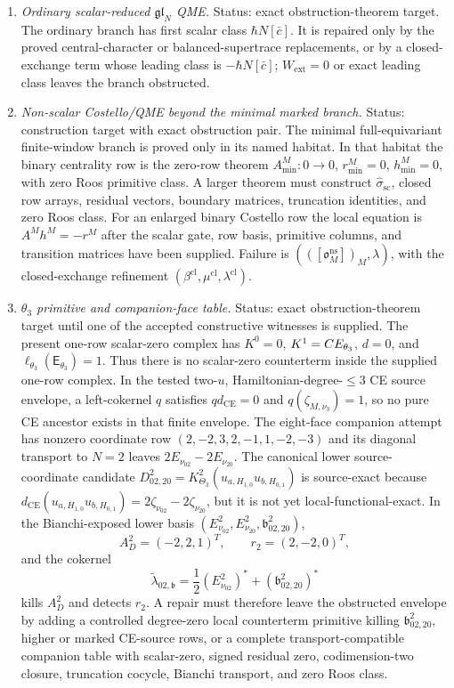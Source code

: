 \begin{enumerate}
  \item \emph{Ordinary scalar-reduced \(\mathfrak{gl}_N\) QME.}
  Status: exact obstruction-theorem target.  The ordinary branch has first
  scalar class \(\hbar N[\bar c]\).  It is repaired only by the proved
  central-character or balanced-supertrace replacements, or by a
  closed-exchange term whose leading class is \(-\hbar N[\bar c]\);
  \(W_{\mathrm{ext}}=0\) or exact leading class leaves the branch
  obstructed.

  \item \emph{Non-scalar Costello/QME beyond the minimal marked branch.}
  Status: construction target with exact obstruction pair.  The minimal
  full-equivariant finite-window branch is proved only in its named
  habitat.  In that habitat the binary centrality row is the zero-row
  theorem
  \(A^M_{\min}:0\to0\), \(r^M_{\min}=0\), \(h^M_{\min}=0\), with zero
  Roos primitive class.  A larger theorem must construct
  \(\widehat\sigma_{\mathrm{sc}}\),
  closed row arrays, residual vectors, boundary matrices, truncation
  identities, and zero Roos class.  For an enlarged binary Costello row
  the local equation is \(A^Mh^M=-r^M\) after the scalar gate, row basis,
  primitive columns, and transition matrices have been supplied.  Failure is
  \((([\mathfrak o^{\mathrm{ns}}_M])_M,\lambda)\), with the
  closed-exchange refinement
  \((\beta^{\mathrm{cl}},\mu^{\mathrm{cl}},\lambda^{\mathrm{cl}})\).

  \item \emph{\(\theta_3\) primitive and companion-face table.}
  Status: exact obstruction-theorem target until one of the accepted
  constructive witnesses is supplied.  The present one-row scalar-zero
  complex has \(K^0=0\), \(K^1=CE_{\theta_3}\), \(d=0\), and
  \(\ell_{\theta_3}(\mathsf E_{\theta_3})=1\).  Thus there is no
  scalar-zero counterterm inside the supplied one-row complex.  In the
  tested two-\(u\), Hamiltonian-degree-\(\le3\) CE source envelope, a
  left-cokernel \(q\) satisfies \(qd_{\mathrm{CE}}=0\) and
  \(q(\zeta_{M,\nu_3})=1\), so no pure CE ancestor exists in that finite
  envelope.  The eight-face companion attempt has nonzero coordinate row
  \((2,-2,3,2,-1,1,-2,-3)\) and its diagonal transport to \(N=2\)
  leaves \(2E_{\nu_{02}}-2E_{\nu_{20}}\).  The canonical lower
  source-coordinate candidate
  \(D^2_{02,20}=K^2_{\Theta_3}
  (u_{a,H_{1,0}}u_{b,H_{0,1}})\) is source-exact because
  \(d_{\mathrm{CE}}(u_{a,H_{1,0}}u_{b,H_{0,1}})
  =2\zeta_{\nu_{02}}-2\zeta_{\nu_{20}}\), but it is not yet
  local-functional-exact.  In the Bianchi-exposed lower basis
  \((E^2_{\nu_{02}},E^2_{\nu_{20}},\mathfrak b^2_{02,20})\),
  \[
    A_D^2=(-2,2,1)^T,\qquad r_2=(2,-2,0)^T,
  \]
  and the cokernel
  \[
    \widetilde\lambda_{02,\mathfrak b}
    =
    \frac12(E^2_{\nu_{02}})^*
    +(\mathfrak b^2_{02,20})^*
  \]
  kills \(A_D^2\) and detects \(r_2\).  A repair must therefore leave
  the obstructed envelope by adding a controlled degree-zero local
  counterterm primitive killing \(\mathfrak b^2_{02,20}\), higher or
  marked CE-source rows, or a complete transport-compatible companion
  table with scalar-zero, signed residual zero, codimension-two closure,
  truncation cocycle, Bianchi transport, and zero Roos class.


\end{enumerate}
